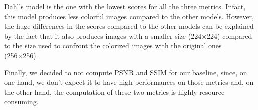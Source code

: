 Dahl's model is the one with the lowest scores for all the three metrics. Infact, this model produces less colorful
images compared to the other models. However, the huge differences in the scores compared to the other models can
be explained by the fact that it also produces images with a smaller size (224×224) compared to the size used to confront the
colorized images with the original ones (256×256).

Finally, we decided to not compute PSNR and SSIM for our baseline, since, on one hand, we don't expect it to have high
performances on those metrics and, on the other hand, the computation of these two metrics is highly resource
consuming.

